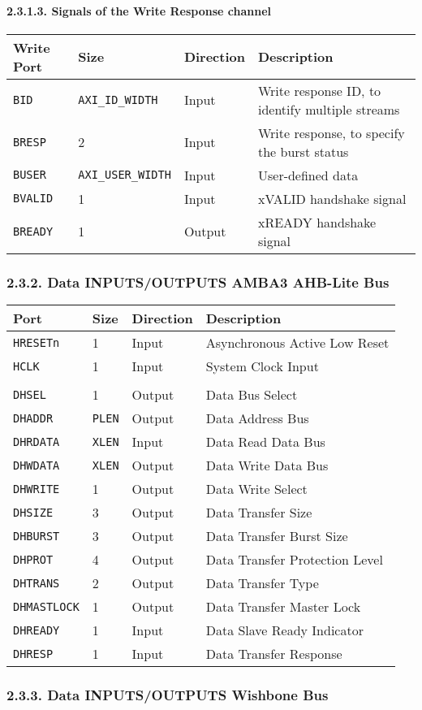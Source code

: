 \documentclass[]{article}
\let\oldparagraph\paragraph
\renewcommand{\paragraph}[1]{\oldparagraph{#1}\mbox{}}
\begin{document}
\paragraph{2.3.1.3. Signals of the Write Response
channel}\label{signals-of-the-write-response-channel-1}

\begin{longtable}[]{@{}llll@{}}
\toprule
Write Port & Size & Direction & Description\tabularnewline
\midrule
\endhead
\texttt{BID} & \texttt{AXI\_ID\_WIDTH} & Input & Write response ID, to
identify multiple streams\tabularnewline
\texttt{BRESP} & 2 & Input & Write response, to specify the burst
status\tabularnewline
\texttt{BUSER} & \texttt{AXI\_USER\_WIDTH} & Input & User-defined
data\tabularnewline
\texttt{BVALID} & 1 & Input & xVALID handshake signal\tabularnewline
\texttt{BREADY} & 1 & Output & xREADY handshake signal\tabularnewline
\bottomrule
\end{longtable}

\subsubsection{2.3.2. Data INPUTS/OUTPUTS AMBA3 AHB-Lite
Bus}\label{data-inputsoutputs-amba3-ahb-lite-bus}

\begin{longtable}[]{@{}llll@{}}
\toprule
Port & Size & Direction & Description\tabularnewline
\midrule
\endhead
\texttt{HRESETn} & 1 & Input & Asynchronous Active Low
Reset\tabularnewline
\texttt{HCLK} & 1 & Input & System Clock Input\tabularnewline
& & &\tabularnewline
\texttt{DHSEL} & 1 & Output & Data Bus Select\tabularnewline
\texttt{DHADDR} & \texttt{PLEN} & Output & Data Address
Bus\tabularnewline
\texttt{DHRDATA} & \texttt{XLEN} & Input & Data Read Data
Bus\tabularnewline
\texttt{DHWDATA} & \texttt{XLEN} & Output & Data Write Data
Bus\tabularnewline
\texttt{DHWRITE} & 1 & Output & Data Write Select\tabularnewline
\texttt{DHSIZE} & 3 & Output & Data Transfer Size\tabularnewline
\texttt{DHBURST} & 3 & Output & Data Transfer Burst Size\tabularnewline
\texttt{DHPROT} & 4 & Output & Data Transfer Protection
Level\tabularnewline
\texttt{DHTRANS} & 2 & Output & Data Transfer Type\tabularnewline
\texttt{DHMASTLOCK} & 1 & Output & Data Transfer Master
Lock\tabularnewline
\texttt{DHREADY} & 1 & Input & Data Slave Ready Indicator\tabularnewline
\texttt{DHRESP} & 1 & Input & Data Transfer Response\tabularnewline
\bottomrule
\end{longtable}

\subsubsection{2.3.3. Data INPUTS/OUTPUTS Wishbone
Bus}\label{data-inputsoutputs-wishbone-bus}
\end{document}
